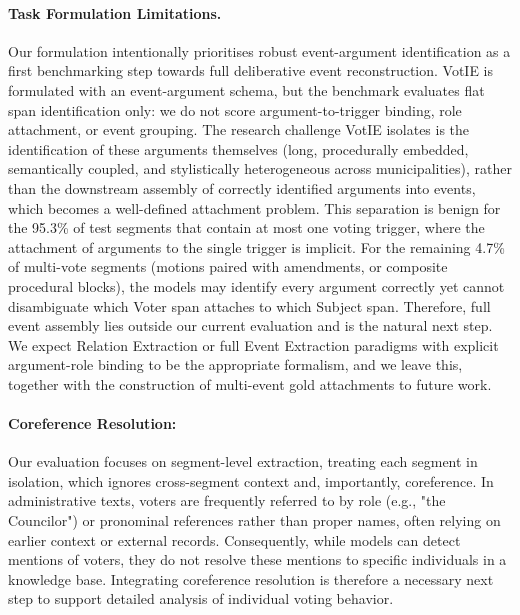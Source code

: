 \documentclass[11pt]{article}
\begin{document}
\paragraph{Task Formulation Limitations.} Our formulation intentionally prioritises robust event-argument identification as a first benchmarking step towards full deliberative event reconstruction. VotIE is formulated with an event-argument schema, but the benchmark evaluates flat span identification only: we do not score argument-to-trigger binding, role attachment, or event grouping. The research challenge VotIE isolates is the identification of these arguments themselves (long, procedurally embedded, semantically coupled, and stylistically heterogeneous across municipalities), rather than the downstream assembly of correctly identified arguments into events, which becomes a well-defined attachment problem. This separation is benign for the 95.3\% of test segments that contain at most one voting trigger, where the attachment of arguments to the single trigger is implicit. For the remaining 4.7\% of multi-vote segments (motions paired with amendments, or composite procedural blocks), the models may identify every argument correctly yet cannot disambiguate which Voter span attaches to which Subject span. Therefore, full event assembly lies outside our current evaluation and is the natural next step. We expect Relation Extraction or full Event Extraction paradigms with explicit argument-role binding to be the appropriate formalism, and we leave this, together with the construction of multi-event gold attachments to future work.  
 
\paragraph{Coreference Resolution:} Our evaluation focuses on segment-level extraction, treating each segment in isolation, which ignores cross-segment context and, importantly, coreference. In administrative texts, voters are frequently referred to by role (e.g., "the Councilor") or pronominal references rather than proper names, often relying on earlier context or external records. Consequently, while models can detect mentions of voters, they do not resolve these mentions to specific individuals in a knowledge base. Integrating coreference resolution is therefore a necessary next step to support detailed analysis of individual voting behavior.

\end{document}
